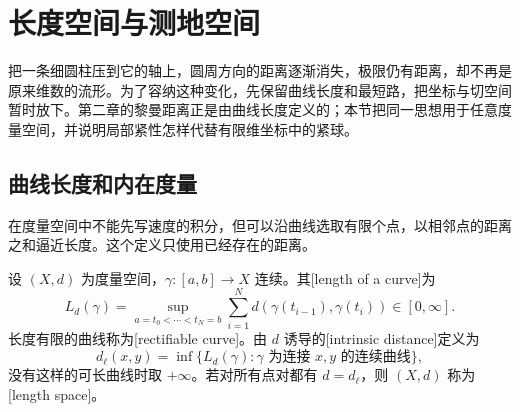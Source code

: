 
% 
% 

\section{长度空间与测地空间}
\label{g3:sec:1001}

把一条细圆柱压到它的轴上，圆周方向的距离逐渐消失，极限仍有距离，却不再是原来维数的流形。为了容纳这种变化，先保留曲线长度和最短路，把坐标与切空间暂时放下。第二章的黎曼距离正是由曲线长度定义的；本节把同一思想用于任意度量空间，并说明局部紧性怎样代替有限维坐标中的紧球。

\subsection{曲线长度和内在度量}
\label{g3:subsec:1001:01}
在度量空间中不能先写速度的积分，但可以沿曲线选取有限个点，以相邻点的距离之和逼近长度。这个定义只使用已经存在的距离。

\begin{definition}\label{g3:def:metric-curve-length}
	设 \((X,d)\) 为度量空间，\(\gamma:[a,b]\to X\) 连续。其[length of a curve]为
	\[
		L_d(\gamma)=\sup_{a=t_0<\cdots<t_N=b}
		\sum_{i=1}^N d(\gamma(t_{i-1}),\gamma(t_i))\in[0,\infty].
	\]
	长度有限的曲线称为[rectifiable curve]。由 \(d\) 诱导的[intrinsic distance]定义为
	\[
		d_\ell(x,y)=\inf\{L_d(\gamma):\gamma\text{ 为连接 }x,y\text{ 的连续曲线}\},
	\]
	没有这样的可长曲线时取 \(+\infty\)。若对所有点对都有 \(d=d_\ell\)，则 \((X,d)\) 称为[length space]。
\end{definition}

